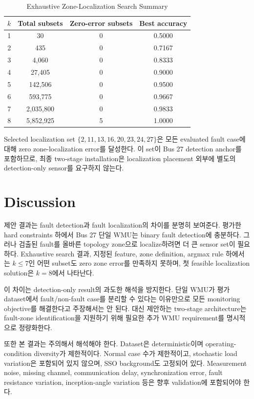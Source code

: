 \documentclass[conference]{IEEEtran}
\begin{document}
\begin{table}[t]
\caption{Exhaustive Zone-Localization Search Summary}
\label{tab:locsearch}
\centering
\begin{tabular}{cccc}
\toprule
$k$ & Total subsets & Zero-error subsets & Best accuracy\\
\midrule
1 & 30 & 0 & 0.5000\\
2 & 435 & 0 & 0.7167\\
3 & 4,060 & 0 & 0.8333\\
4 & 27,405 & 0 & 0.9000\\
5 & 142,506 & 0 & 0.9500\\
6 & 593,775 & 0 & 0.9667\\
7 & 2,035,800 & 0 & 0.9833\\
8 & 5,852,925 & 5 & 1.0000\\
\bottomrule
\end{tabular}
\end{table}

Selected localization set $\{2,11,13,16,20,23,24,27\}$은 모든 evaluated fault case에 대해 zero zone-localization error를 달성한다. 이 set이 Bus 27 detection anchor를 포함하므로, 최종 two-stage installation은 localization placement 외부에 별도의 detection-only sensor를 요구하지 않는다.

\section{Discussion}

제안 결과는 fault detection과 fault localization의 차이를 분명히 보여준다. 평가한 hard constraints 하에서 Bus 27 단일 WMU는 binary fault detection에 충분하다. 그러나 검출된 fault를 올바른 topology zone으로 localize하려면 더 큰 sensor set이 필요하다. Exhaustive search 결과, 지정된 feature, zone definition, argmax rule 하에서는 $k\leq 7$인 어떤 subset도 zero zone error를 만족하지 못하며, 첫 feasible localization solution은 $k=8$에서 나타난다.

이 차이는 detection-only result의 과도한 해석을 방지한다. 단일 WMU가 평가 dataset에서 fault/non-fault case를 분리할 수 있다는 이유만으로 모든 monitoring objective를 해결한다고 주장해서는 안 된다. 대신 제안하는 two-stage architecture는 fault-zone identification을 지원하기 위해 필요한 추가 WMU requirement를 명시적으로 정량화한다.

또한 본 결과는 주의해서 해석해야 한다. Dataset은 deterministic이며 operating-condition diversity가 제한적이다. Normal case 수가 제한적이고, stochastic load variation은 포함되어 있지 않으며, SSO background도 고정되어 있다. Measurement noise, missing channel, communication delay, synchronization error, fault resistance variation, inception-angle variation 등은 향후 validation에 포함되어야 한다.
\end{document}
